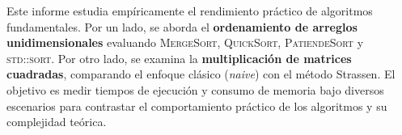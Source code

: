 
Este informe estudia empíricamente el rendimiento práctico de algoritmos fundamentales. Por un lado, se aborda el \textbf{ordenamiento de arreglos unidimensionales} evaluando \textsc{MergeSort}, \textsc{QuickSort}, \textsc{PatiendeSort} y \textsc{std::sort}. Por otro lado, se examina la \textbf{multiplicación de matrices cuadradas}, comparando el enfoque clásico (\textit{naive}) con el método Strassen. El objetivo es medir tiempos de ejecución y consumo de memoria bajo diversos escenarios para contrastar el comportamiento práctico de los algoritmos y su complejidad teórica.

